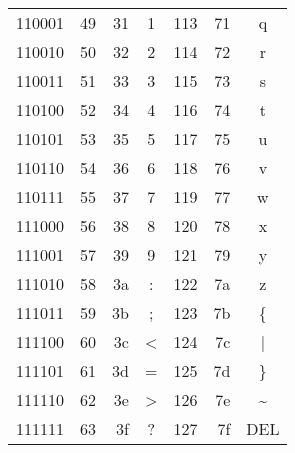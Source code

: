 \begin{tabular}{C|RRC|RRC}
	110001 & 49  & 31  & 1     & 113 & 71  & q                \\
	110010 & 50  & 32  & 2     & 114 & 72  & r                \\
	110011 & 51  & 33  & 3     & 115 & 73  & s                \\
	110100 & 52  & 34  & 4     & 116 & 74  & t                \\
	110101 & 53  & 35  & 5     & 117 & 75  & u                \\
	110110 & 54  & 36  & 6     & 118 & 76  & v                \\
	110111 & 55  & 37  & 7     & 119 & 77  & w                \\
	111000 & 56  & 38  & 8     & 120 & 78  & x                \\
	111001 & 57  & 39  & 9     & 121 & 79  & y                \\
	111010 & 58  & 3a  & :     & 122 & 7a  & z                \\
	111011 & 59  & 3b  & ;     & 123 & 7b  & \{               \\
	111100 & 60  & 3c  & <     & 124 & 7c  & |                \\
	111101 & 61  & 3d  & =     & 125 & 7d  & \}               \\
	111110 & 62  & 3e  & >     & 126 & 7e  & \textasciitilde  \\
	111111 & 63  & 3f  & ?     & 127 & 7f  & DEL              \\
	\bottomrule
\end{tabular}
